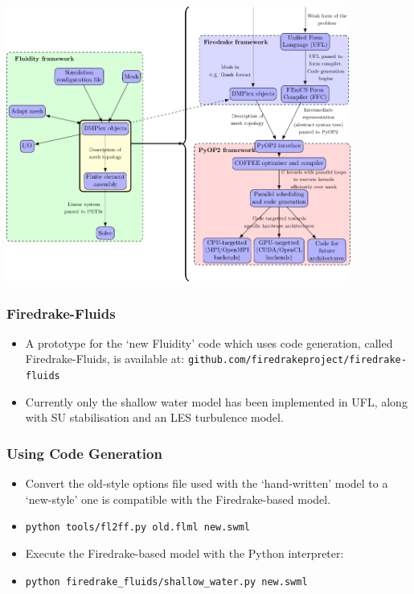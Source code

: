 \documentclass[12pt]{beamer}
\begin{document}
\begin{frame}
    \frametitle{}
\begin{center} 
\includegraphics[width=0.85\textwidth]{images/assembly_replacement.png} 
\end{center}
\end{frame}

\begin{frame}
    \frametitle{Firedrake-Fluids}
\begin{itemize}
    \item A prototype for the `new Fluidity' code which uses code generation, called Firedrake-Fluids, is available at: \texttt{github.com/firedrakeproject/firedrake-fluids}
    \item Currently only the shallow water model has been implemented in UFL, along with SU stabilisation and an LES turbulence model.
\end{itemize}
\end{frame}

\begin{frame}
    \frametitle{Using Code Generation}
\begin{itemize}
    \item Convert the old-style options file used with the `hand-written' model to a `new-style' one is compatible with the Firedrake-based model.
    \item \texttt{python tools/fl2ff.py old.flml new.swml}
    \item Execute the Firedrake-based model with the Python interpreter:
    \item \texttt{python firedrake\_fluids/shallow\_water.py new.swml}
\end{itemize}
\end{frame}
\end{document}
